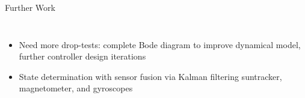 \documentclass[slidestop,compress]{beamer}
\begin{document}
\begin{frame}[plain]
\begin{block}{\vspace{0.5 cm}

\centering Further Work}

\begin{columns}
\begin{itemize}
\item Need more drop-tests: complete Bode diagram to improve dynamical model, further controller design iterations
\item State determination with sensor fusion via Kalman filtering suntracker, magnetometer, and gyroscopes
\end{itemize}
\end{columns}

\vspace{0.5 cm}
\end{block}    
\end{frame}
\end{document}
